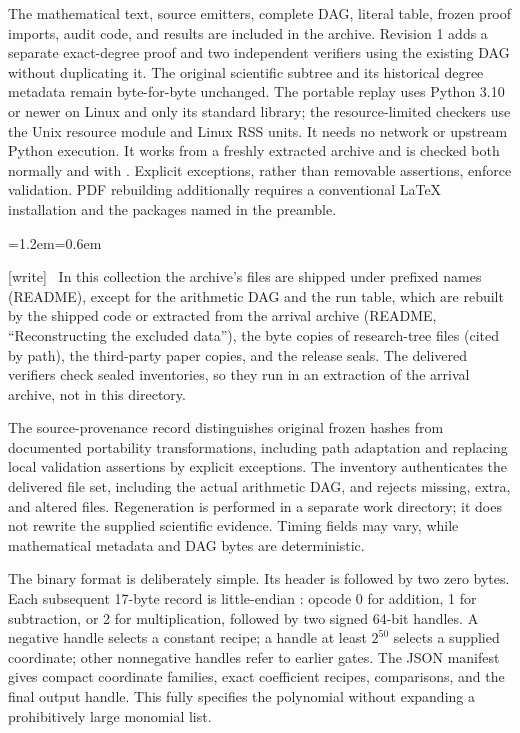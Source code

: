 \documentclass[11pt,letterpaper]{article}
\theoremstyle{definition}\newtheorem{definition}[theorem]{Definition}
\theoremstyle{remark}\newtheorem{remark}[theorem]{Remark}
\newcommand{\fname}[1]{\texttt{\small\detokenize{#1}}}
\newcommand{\wtag}{\textup{[write]}}
\newenvironment{writenote}{\par\smallskip\begin{list}{}{\leftmargin=1.2em\rightmargin=0.6em}\item[]\small\wtag\ }{\end{list}\smallskip}
\begin{document}
The mathematical text, source emitters, complete DAG, literal table, frozen proof imports, audit code, and results are included in the archive. Revision 1 adds a separate exact-degree proof and two independent verifiers using the existing DAG without duplicating it. The original scientific subtree and its historical degree metadata remain byte-for-byte unchanged. The portable replay uses Python 3.10 or newer on Linux and only its standard library; the resource-limited checkers use the Unix resource module and Linux RSS units. It needs no network or upstream Python execution. It works from a freshly extracted archive and is checked both normally and with \fname{python3 -O}. Explicit exceptions, rather than removable assertions, enforce validation. PDF rebuilding additionally requires a conventional LaTeX installation and the packages named in the preamble.
\begin{writenote}
In this collection the archive's files are shipped under prefixed names (README), except for the arithmetic DAG and the run table, which are rebuilt by the shipped code or extracted from the arrival archive (README, ``Reconstructing the excluded data''), the byte copies of research-tree files (cited by path), the third-party paper copies, and the release seals. The delivered verifiers check sealed inventories, so they run in an extraction of the arrival archive, not in this directory.
\end{writenote}

The source-provenance record distinguishes original frozen hashes from documented portability transformations, including path adaptation and replacing local validation assertions by explicit exceptions. The inventory authenticates the delivered file set, including the actual arithmetic DAG, and rejects missing, extra, and altered files. Regeneration is performed in a separate work directory; it does not rewrite the supplied scientific evidence. Timing fields may vary, while mathematical metadata and DAG bytes are deterministic.

The binary format is deliberately simple. Its header is \fname{CDAGv1} followed by two zero bytes. Each subsequent 17-byte record is little-endian \fname{<Bqq}: opcode 0 for addition, 1 for subtraction, or 2 for multiplication, followed by two signed 64-bit handles. A negative handle selects a constant recipe; a handle at least $2^{50}$ selects a supplied coordinate; other nonnegative handles refer to earlier gates. The JSON manifest gives compact coordinate families, exact coefficient recipes, comparisons, and the final output handle. This fully specifies the polynomial without expanding a prohibitively large monomial list.
\end{document}
